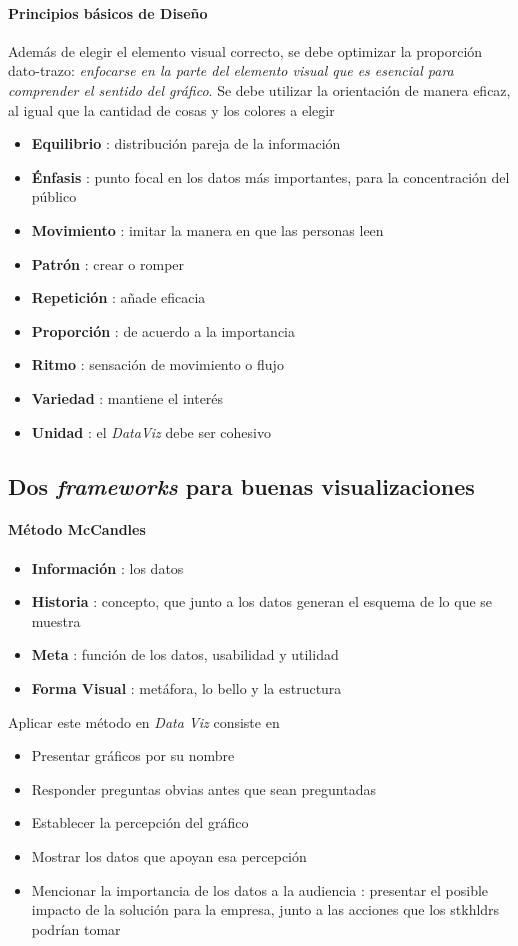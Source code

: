\paragraph{Principios básicos de Diseño}
Además de elegir el elemento visual correcto, se debe optimizar la proporción dato-trazo: \textit{enfocarse en la parte del elemento visual que es esencial para comprender el sentido del gráfico}. Se debe utilizar la orientación de manera eficaz, al igual que la cantidad de cosas y los colores a elegir
\begin{itemize}
    \item {\textbf{Equilibrio} : distribución pareja de la información}
    \item {\textbf{Énfasis} : punto focal en los datos más importantes, para la concentración del público}
    \item {\textbf{Movimiento} : imitar la manera en que las personas leen}
    \item {\textbf{Patrón} : crear o romper}
    \item {\textbf{Repetición} : añade eficacia}
    \item {\textbf{Proporción} : de acuerdo a la importancia}
    \item {\textbf{Ritmo} : sensación de movimiento o flujo}
    \item {\textbf{Variedad} : mantiene el interés}
    \item {\textbf{Unidad} : el \textit{DataViz} debe ser cohesivo}
\end{itemize}

\subsection{Dos \textit{frameworks} para buenas visualizaciones}
\paragraph{Método McCandles}
\begin{itemize}
    \item {\textbf{Información} : los datos}
    \item {\textbf{Historia} : concepto, que junto a los datos generan el esquema de lo que se muestra}
    \item {\textbf{Meta} : función de los datos, usabilidad y utilidad}
    \item {\textbf{Forma Visual} : metáfora, lo bello y la estructura}
\end{itemize}
Aplicar este método en \textit{Data Viz} consiste en
\begin{itemize}
    \item {Presentar gráficos por su nombre}
    \item {Responder preguntas obvias antes que sean preguntadas}
    \item {Establecer la percepción del gráfico}
    \item {Mostrar los datos que apoyan esa percepción}
    \item {Mencionar la importancia de los datos a la audiencia : presentar el posible impacto de la solución para la empresa, junto a las acciones que los \gls{stkhldrs} podrían tomar}
\end{itemize}

